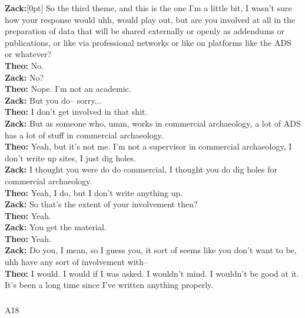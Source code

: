 \documentclass[
]{article}
\makeatletter
\let\oldsubparagraph\subparagraph
\renewcommand{\subparagraph}{
    \@ifstar
      \xxxSubParagraphStar
      \xxxSubParagraphNoStar
  }
\newcommand{\xxxSubParagraphStar}[1]{\oldsubparagraph*{#1}\mbox{}}
\newcommand{\xxxSubParagraphNoStar}[1]{\oldsubparagraph{#1}\mbox{}}
\newcommand{\paragraphnumber}[1]{\marginnote{\color{lightgray}\tiny{#1}}[0pt]}
\makeatother
\begin{document}
\textbf{Zack:}\paragraphnumber{[68]} So the third theme, and this is the
one I'm a little bit, I wasn't sure how your response would uhh, would
play out, but are you involved at all in the preparation of data that
will be shared externally or openly as addendums or publications, or
like via professional networks or like on platforms like the ADS or
whatever?\\
\textbf{Theo:} No.\\
\textbf{Zack:} No?\\
\textbf{Theo:} Nope. I'm not an academic.\\
\textbf{Zack:} But you do-- sorry...\\
\textbf{Theo:} I don't get involved in that shit.\\
\textbf{Zack:} But as someone who, umm, works in commercial archaeology,
a lot of ADS has a lot of stuff in commercial archaeology.\\
\textbf{Theo:} Yeah, but it's not me. I'm not a supervisor in commercial
archaeology, I don't write up sites, I just dig holes.\\
\textbf{Zack:} I thought you were do do commercial, I thought you do dig
holes for commercial archaeology.\\
\textbf{Theo:} Yeah, I do, but I don't write anything up.\\
\textbf{Zack:} So that's the extent of your involvement then?\\
\textbf{Theo:} Yeah.\\
\textbf{Zack:} You get the material.\\
\textbf{Theo:} Yeah.\\
\textbf{Zack:} Do you, I mean, so I guess you, it sort of seems like you
don't want to be, uhh have any sort of involvement with--\\
\textbf{Theo:} I would. I would if I was asked. I wouldn't mind. I
wouldn't be good at it. It's been a long time since I've written
anything properly.

\subparagraph{A18}\label{sec-A18}
\end{document}
